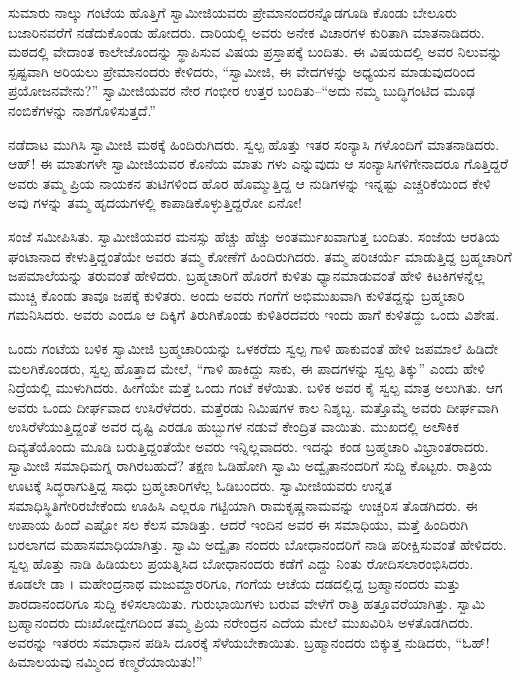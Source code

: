 ಸುಮಾರು ನಾಲ್ಕು ಗಂಟೆಯ ಹೊತ್ತಿಗೆ ಸ್ವಾಮೀಜಿಯವರು ಪ್ರೇಮಾನಂದರನ್ನೊಡಗೂಡಿ ಕೊಂಡು ಬೇಲೂರು ಬಜಾರಿನವರೆಗೆ ನಡೆದುಕೊಂಡು ಹೋದರು. ದಾರಿಯಲ್ಲಿ ಅವರು ಅನೇಕ ವಿಚಾರಗಳ ಕುರಿತಾಗಿ ಮಾತನಾಡಿದರು. ಮಠದಲ್ಲಿ ವೇದಾಂತ ಕಾಲೇಜೊಂದನ್ನು ಸ್ಥಾಪಿಸುವ ವಿಷಯ ಪ್ರಸ್ತಾಪಕ್ಕೆ ಬಂದಿತು. ಈ ವಿಷಯದಲ್ಲಿ ಅವರ ನಿಲುವನ್ನು ಸ್ಪಷ್ಟವಾಗಿ ಅರಿಯಲು ಪ್ರೇಮಾನಂದರು ಕೇಳಿದರು, “ಸ್ವಾಮೀಜಿ, ಈ ವೇದಗಳನ್ನು ಅಧ್ಯಯನ ಮಾಡುವುದರಿಂದ ಪ್ರಯೋಜನವೇನು?” ಸ್ವಾಮೀಜಿಯವರ ನೇರ ಗಂಭೀರ ಉತ್ತರ ಬಂದಿತು–“ಅದು ನಮ್ಮ ಬುದ್ಧಿಗಂಟಿದ ಮೂಢ ನಂಬಿಕೆಗಳನ್ನು ನಾಶಗೊಳಿಸುತ್ತದೆ.”

ನಡೆದಾಟ ಮುಗಿಸಿ ಸ್ವಾಮೀಜಿ ಮಠಕ್ಕೆ ಹಿಂದಿರುಗಿದರು. ಸ್ವಲ್ಪ ಹೊತ್ತು ಇತರ ಸಂನ್ಯಾಸಿ ಗಳೊಂದಿಗೆ ಮಾತನಾಡಿದರು. ಆಹ್! ಈ ಮಾತುಗಳೇ ಸ್ವಾಮೀಜಿಯವರ ಕೊನೆಯ ಮಾತು ಗಳು ಎನ್ನುವುದು ಆ ಸಂನ್ಯಾಸಿಗಳಿಗೇನಾದರೂ ಗೊತ್ತಿದ್ದರೆ ಅವರು ತಮ್ಮ ಪ್ರಿಯ ನಾಯಕನ ತುಟಿಗಳಿಂದ ಹೊರ ಹೊಮ್ಮುತ್ತಿದ್ದ ಆ ನುಡಿಗಳನ್ನು ಇನ್ನಷ್ಟು ಎಚ್ಚರಿಕೆಯಿಂದ ಕೇಳಿ ಅವು ಗಳನ್ನು ತಮ್ಮ ಹೃದಯಗಳಲ್ಲಿ ಕಾಪಾಡಿಕೊಳ್ಳುತ್ತಿದ್ದರೋ ಏನೋ!

ಸಂಜೆ ಸಮೀಪಿಸಿತು. ಸ್ವಾಮೀಜಿಯವರ ಮನಸ್ಸು ಹೆಚ್ಚು ಹೆಚ್ಚು ಅಂತರ್ಮುಖವಾಗುತ್ತ ಬಂದಿತು. ಸಂಜೆಯ ಆರತಿಯ ಘಂಟಾನಾದ ಕೇಳುತ್ತಿದ್ದಂತೆಯೇ ಅವರು ತಮ್ಮ ಕೋಣೆಗೆ ಹಿಂದಿರುಗಿದರು. ತಮ್ಮ ಪರಿಚರ್ಯೆ ಮಾಡುತ್ತಿದ್ದ ಬ್ರಹ್ಮಚಾರಿಗೆ ಜಪಮಾಲೆಯನ್ನು ತರುವಂತೆ ಹೇಳಿದರು. ಬ್ರಹ್ಮಚಾರಿಗೆ ಹೊರಗೆ ಕುಳಿತು ಧ್ಯಾನಮಾಡುವಂತೆ ಹೇಳಿ ಕಿಟಕಿಗಳನ್ನೆಲ್ಲ ಮುಚ್ಚಿ ಕೊಂಡು ತಾವೂ ಜಪಕ್ಕೆ ಕುಳಿತರು. ಅಂದು ಅವರು ಗಂಗೆಗೆ ಅಭಿಮುಖವಾಗಿ ಕುಳಿತದ್ದನ್ನು ಬ್ರಹ್ಮಚಾರಿ ಗಮನಿಸಿದರು. ಅವರು ಎಂದೂ ಆ ದಿಕ್ಕಿಗೆ ತಿರುಗಿಕೊಂಡು ಕುಳಿತಿರದವರು ಇಂದು ಹಾಗೆ ಕುಳಿತದ್ದು ಒಂದು ವಿಶೇಷ.

ಒಂದು ಗಂಟೆಯ ಬಳಿಕ ಸ್ವಾಮೀಜಿ ಬ್ರಹ್ಮಚಾರಿಯನ್ನು ಒಳಕರೆದು ಸ್ವಲ್ಪ ಗಾಳಿ ಹಾಕುವಂತೆ ಹೇಳಿ ಜಪಮಾಲೆ ಹಿಡಿದೇ ಮಲಗಿಕೊಂಡರು, ಸ್ವಲ್ಪ ಹೊತ್ತಾದ ಮೇಲೆ, “ಗಾಳಿ ಹಾಕಿದ್ದು ಸಾಕು, ಈ ಪಾದಗಳನ್ನು ಸ್ವಲ್ಪ ತಿಕ್ಕು” ಎಂದು ಹೇಳಿ ನಿದ್ರೆಯಲ್ಲಿ ಮುಳುಗಿದರು. ಹೀಗೆಯೇ ಮತ್ತೆ ಒಂದು ಗಂಟೆ ಕಳೆಯಿತು. ಬಳಿಕ ಅವರ ಕೈ ಸ್ವಲ್ಪ ಮಾತ್ರ ಅಲುಗಿತು. ಆಗ ಅವರು ಒಂದು ದೀರ್ಘವಾದ ಉಸಿರೆಳೆದರು. ಮತ್ತೆರಡು ನಿಮಿಷಗಳ ಕಾಲ ನಿಶ್ಶಬ್ದ. ಮತ್ತೊಮ್ಮೆ ಅವರು ದೀರ್ಘವಾಗಿ ಉಸಿರೆಳೆಯುತ್ತಿದ್ದಂತೆ ಅವರ ದೃಷ್ಟಿ ಎರಡೂ ಹುಬ್ಬುಗಳ ನಡುವೆ ಕೇಂದ್ರಿತ ವಾಯಿತು. ಮುಖದಲ್ಲಿ ಅಲೌಕಿಕ ದಿವ್ಯತೆಯೊಂದು ಮೂಡಿ ಬರುತ್ತಿದ್ದಂತೆಯೇ ಅವರು ಇನ್ನಿಲ್ಲವಾದರು. ಇದನ್ನು ಕಂಡ ಬ್ರಹ್ಮಚಾರಿ ವಿಭ್ರಾಂತರಾದರು. ಸ್ವಾಮೀಜಿ ಸಮಾಧಿಮಗ್ನ ರಾಗಿರಬಹುದೆ? ತಕ್ಷಣ ಓಡಿಹೋಗಿ ಸ್ವಾಮಿ ಅದ್ವೈತಾನಂದರಿಗೆ ಸುದ್ದಿ ಕೊಟ್ಟರು. ರಾತ್ರಿಯ ಊಟಕ್ಕೆ ಸಿದ್ಧರಾಗುತ್ತಿದ್ದ ಸಾಧು ಬ್ರಹ್ಮಚಾರಿಗಳೆಲ್ಲ ಓಡಿಬಂದರು. ಸ್ವಾಮೀಜಿಯವರು ಉನ್ನತ ಸಮಾಧಿಸ್ಥಿತಿಗೇರಿರಬೇಕೆಂದು ಊಹಿಸಿ ಎಲ್ಲರೂ ಗಟ್ಟಿಯಾಗಿ ರಾಮಕೃಷ್ಣನಾಮವನ್ನು ಉಚ್ಚರಿಸ ತೊಡಗಿದರು. ಈ ಉಪಾಯ ಹಿಂದೆ ಎಷ್ಟೋ ಸಲ ಕೆಲಸ ಮಾಡಿತ್ತು. ಆದರೆ ಇಂದಿನ ಅವರ ಈ ಸಮಾಧಿಯು, ಮತ್ತೆ ಹಿಂದಿರುಗಿ ಬರಲಾಗದ ಮಹಾಸಮಾಧಿಯಾಗಿತ್ತು. ಸ್ವಾಮಿ ಅದ್ವೈತಾ ನಂದರು ಬೋಧಾನಂದರಿಗೆ ನಾಡಿ ಪರೀಕ್ಷಿಸುವಂತೆ ಹೇಳಿದರು. ಸ್ವಲ್ಪ ಹೊತ್ತು ನಾಡಿ ಹಿಡಿಯಲು ಪ್ರಯತ್ನಿಸಿದ ಬೋಧಾನಂದರು ಕಡೆಗೆ ಎದ್ದು ನಿಂತು ರೋದಿಸಲಾರಂಭಿಸಿದರು. ಕೂಡಲೇ ಡಾ । ಮಹೇಂದ್ರನಾಥ ಮಜುಮ್ದಾರರಿಗೂ, ಗಂಗೆಯ ಆಚೆಯ ದಡದಲ್ಲಿದ್ದ ಬ್ರಹ್ಮಾನಂದರು ಮತ್ತು ಶಾರದಾನಂದರಿಗೂ ಸುದ್ದಿ ಕಳಿಸಲಾಯಿತು. ಗುರುಭಾಯಿಗಳು ಬರುವ ವೇಳೆಗೆ ರಾತ್ರಿ ಹತ್ತೂವರೆಯಾಗಿತ್ತು. ಸ್ವಾಮಿ ಬ್ರಹ್ಮಾನಂದರು ದುಃಖೋದ್ವೇಗದಿಂದ ತಮ್ಮ ಪ್ರಿಯ ನರೇಂದ್ರನ ಎದೆಯ ಮೇಲೆ ಮುಖವಿರಿಸಿ ಅಳತೊಡಗಿದರು. ಅವರನ್ನು ಇತರರು ಸಮಾಧಾನ ಪಡಿಸಿ ದೂರಕ್ಕೆ ಸೆಳೆಯಬೇಕಾಯಿತು. ಬ್ರಹ್ಮಾನಂದರು ಬಿಕ್ಕುತ್ತ ನುಡಿದರು, “ಓಹ್​! ಹಿಮಾಲಯವು ನಮ್ಮಿಂದ ಕಣ್ಮರೆಯಾಯಿತು!”

